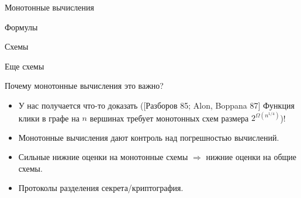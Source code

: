 \begin{frame}{Монотонные вычисления}

    \begin{minipage}{0.33\linewidth}
        \centering
        Формулы
        \vspace{0.2cm}
        
        
    \end{minipage}
    \begin{minipage}{0.33\linewidth}
        \centering
        Схемы
        \vspace{0.2cm}
        
        
    \end{minipage}
    \begin{minipage}{0.32\linewidth}
        \centering
        Еще схемы
        \vspace{0.2cm}
        
        
    \end{minipage}

    \pause
    Почему монотонные вычисления это важно?
    \begin{itemize}
        \item У нас получается что-то доказать ([Разборов 85; Alon, Boppana 87] Функция клики в графе на
            $n$ вершинах требует монотонных схем размера $2^{\Omega(n^{1 / 4})}$)! 
            \pause
        \item Монотонные вычисления дают контроль над погрешностью вычислений.
            \pause
        \item Сильные нижние оценки на монотонные схемы $\Rightarrow$ нижние оценки на общие схемы.
            \pause
        \item Протоколы разделения секрета/криптография.
    \end{itemize}
\end{frame}

